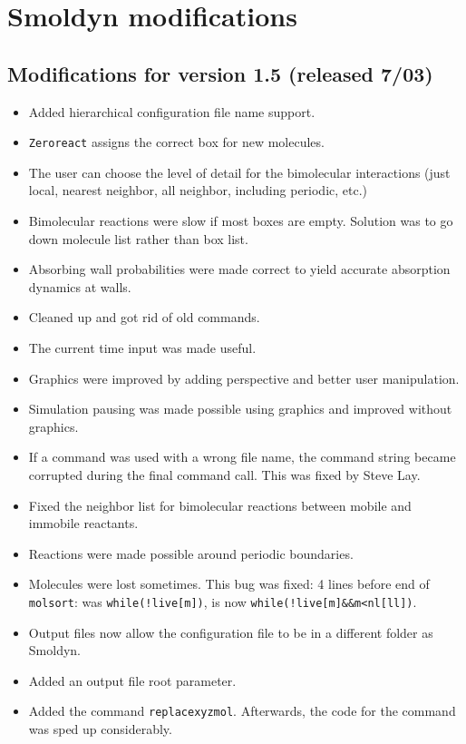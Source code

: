 \documentclass {scrbook}
\newcommand {\ttt} {\texttt}
\begin{document}
\chapter{Smoldyn modifications}

\renewcommand{\labelitemi}{$\cdot$}

\section{Modifications for version 1.5 (released 7/03)}
\begin{itemize}
\item Added hierarchical configuration file name support.
\item \ttt{Zeroreact} assigns the correct box for new molecules.
\item The user can choose the level of detail for the bimolecular interactions (just local, nearest neighbor, all neighbor, including periodic, etc.)
\item Bimolecular reactions were slow if most boxes are empty. Solution was to go down molecule list rather than box list.
\item Absorbing wall probabilities were made correct to yield accurate absorption dynamics at walls.
\item Cleaned up and got rid of old commands.
\item The current time input was made useful.
\item Graphics were improved by adding perspective and better user manipulation.
\item Simulation pausing was made possible using graphics and improved without graphics.
\item If a command was used with a wrong file name, the command string became corrupted during the final command call. This was fixed by Steve Lay.
\item Fixed the neighbor list for bimolecular reactions between mobile and immobile reactants.
\item Reactions were made possible around periodic boundaries.
\item Molecules were lost sometimes. This bug was fixed: 4 lines before end of \ttt{molsort}: was \lstinline{while(!live[m])}, is now \lstinline{while(!live[m]&&m<nl[ll])}.
\item Output files now allow the configuration file to be in a different folder as Smoldyn.
\item Added an output file root parameter.
\item Added the command \ttt{replacexyzmol}. Afterwards, the code for the command was sped up considerably.

\end{itemize}
\end{document}
